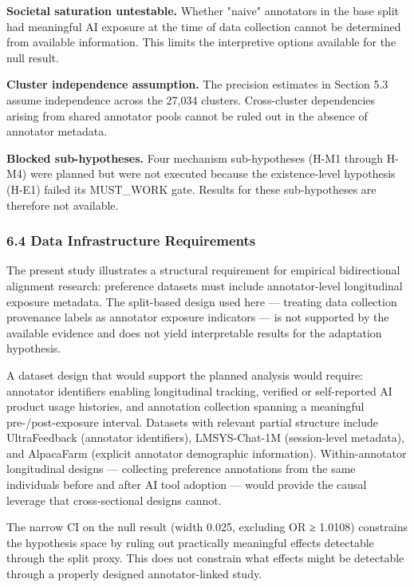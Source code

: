 \textbf{Societal saturation untestable.} Whether "naive" annotators in the base split had meaningful AI exposure at the time of data collection cannot be determined from available information. This limits the interpretive options available for the null result.

\textbf{Cluster independence assumption.} The precision estimates in Section 5.3 assume independence across the 27,034 clusters. Cross-cluster dependencies arising from shared annotator pools cannot be ruled out in the absence of annotator metadata.

\textbf{Blocked sub-hypotheses.} Four mechanism sub-hypotheses (H-M1 through H-M4) were planned but were not executed because the existence-level hypothesis (H-E1) failed its MUST_WORK gate. Results for these sub-hypotheses are therefore not available.

\subsubsection{6.4 Data Infrastructure Requirements}

The present study illustrates a structural requirement for empirical bidirectional alignment research: preference datasets must include annotator-level longitudinal exposure metadata. The split-based design used here — treating data collection provenance labels as annotator exposure indicators — is not supported by the available evidence and does not yield interpretable results for the adaptation hypothesis.

A dataset design that would support the planned analysis would require: annotator identifiers enabling longitudinal tracking, verified or self-reported AI product usage histories, and annotation collection spanning a meaningful pre-/post-exposure interval. Datasets with relevant partial structure include UltraFeedback (annotator identifiers), LMSYS-Chat-1M (session-level metadata), and AlpacaFarm (explicit annotator demographic information). Within-annotator longitudinal designs — collecting preference annotations from the same individuals before and after AI tool adoption — would provide the causal leverage that cross-sectional designs cannot.

The narrow CI on the null result (width 0.025, excluding OR ≥ 1.0108) constrains the hypothesis space by ruling out practically meaningful effects detectable through the split proxy. This does not constrain what effects might be detectable through a properly designed annotator-linked study.

